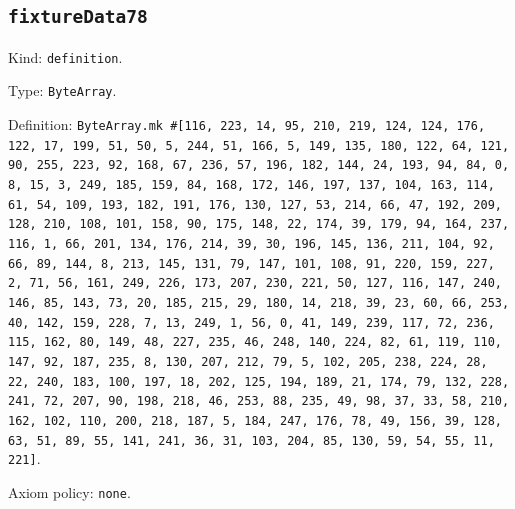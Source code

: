 \documentclass[11pt]{article}
\begin{document}
\subsection*{\texttt{fixtureData78}}
\noindent Kind: \texttt{definition}.\par
\noindent Type: \texttt{ByteArray}.\par
\noindent Definition: \texttt{ByteArray.mk \#[116, 223, 14, 95, 210, 219, 124, 124, 176, 122, 17, 199, 51, 50, 5, 244, 51, 166, 5, 149, 135, 180, 122, 64, 121, 90, 255, 223, 92, 168, 67, 236, 57, 196, 182, 144, 24, 193, 94, 84, 0, 8, 15, 3, 249, 185, 159, 84, 168, 172, 146, 197, 137, 104, 163, 114, 61, 54, 109, 193, 182, 191, 176, 130, 127, 53, 214, 66, 47, 192, 209, 128, 210, 108, 101, 158, 90, 175, 148, 22, 174, 39, 179, 94, 164, 237, 116, 1, 66, 201, 134, 176, 214, 39, 30, 196, 145, 136, 211, 104, 92, 66, 89, 144, 8, 213, 145, 131, 79, 147, 101, 108, 91, 220, 159, 227, 2, 71, 56, 161, 249, 226, 173, 207, 230, 221, 50, 127, 116, 147, 240, 146, 85, 143, 73, 20, 185, 215, 29, 180, 14, 218, 39, 23, 60, 66, 253, 40, 142, 159, 228, 7, 13, 249, 1, 56, 0, 41, 149, 239, 117, 72, 236, 115, 162, 80, 149, 48, 227, 235, 46, 248, 140, 224, 82, 61, 119, 110, 147, 92, 187, 235, 8, 130, 207, 212, 79, 5, 102, 205, 238, 224, 28, 22, 240, 183, 100, 197, 18, 202, 125, 194, 189, 21, 174, 79, 132, 228, 241, 72, 207, 90, 198, 218, 46, 253, 88, 235, 49, 98, 37, 33, 58, 210, 162, 102, 110, 200, 218, 187, 5, 184, 247, 176, 78, 49, 156, 39, 128, 63, 51, 89, 55, 141, 241, 36, 31, 103, 204, 85, 130, 59, 54, 55, 11, 221]}.\par
\noindent Axiom policy: \texttt{none}.\par
\end{document}
